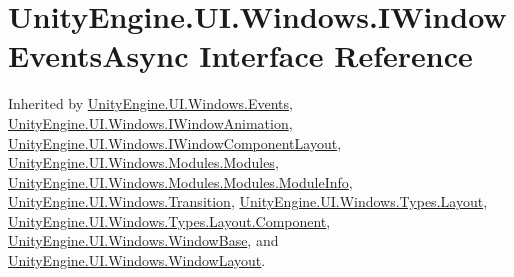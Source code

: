 \hypertarget{interface_unity_engine_1_1_u_i_1_1_windows_1_1_i_window_events_async}{}\section{Unity\+Engine.\+U\+I.\+Windows.\+I\+Window\+Events\+Async Interface Reference}
\label{interface_unity_engine_1_1_u_i_1_1_windows_1_1_i_window_events_async}


Inherited by \hyperlink{class_unity_engine_1_1_u_i_1_1_windows_1_1_events}{Unity\+Engine.\+U\+I.\+Windows.\+Events}, \hyperlink{interface_unity_engine_1_1_u_i_1_1_windows_1_1_i_window_animation}{Unity\+Engine.\+U\+I.\+Windows.\+I\+Window\+Animation}, \hyperlink{interface_unity_engine_1_1_u_i_1_1_windows_1_1_i_window_component_layout}{Unity\+Engine.\+U\+I.\+Windows.\+I\+Window\+Component\+Layout}, \hyperlink{class_unity_engine_1_1_u_i_1_1_windows_1_1_modules_1_1_modules}{Unity\+Engine.\+U\+I.\+Windows.\+Modules.\+Modules}, \hyperlink{class_unity_engine_1_1_u_i_1_1_windows_1_1_modules_1_1_modules_1_1_module_info}{Unity\+Engine.\+U\+I.\+Windows.\+Modules.\+Modules.\+Module\+Info}, \hyperlink{class_unity_engine_1_1_u_i_1_1_windows_1_1_transition}{Unity\+Engine.\+U\+I.\+Windows.\+Transition}, \hyperlink{class_unity_engine_1_1_u_i_1_1_windows_1_1_types_1_1_layout}{Unity\+Engine.\+U\+I.\+Windows.\+Types.\+Layout}, \hyperlink{class_unity_engine_1_1_u_i_1_1_windows_1_1_types_1_1_layout_1_1_component}{Unity\+Engine.\+U\+I.\+Windows.\+Types.\+Layout.\+Component}, \hyperlink{class_unity_engine_1_1_u_i_1_1_windows_1_1_window_base}{Unity\+Engine.\+U\+I.\+Windows.\+Window\+Base}, and \hyperlink{class_unity_engine_1_1_u_i_1_1_windows_1_1_window_layout}{Unity\+Engine.\+U\+I.\+Windows.\+Window\+Layout}.

